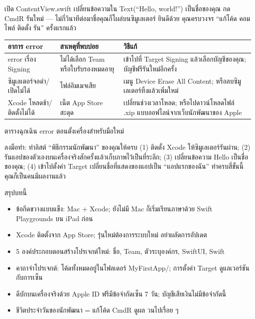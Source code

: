 

เปิด ContentView.swift เปลี่ยนข้อความใน Text(“Hello, world!”) เป็นชื่อของคุณ กด CmdR รันใหม่ — ไม่กี่วินาทีต่อมาชื่อคุณก็โผล่บนซิมูเลเตอร์ ยินดีด้วย คุณครบวงจร “แก้โค้ด คอมไพล์ ติดตั้ง รัน” ครั้งแรกแล้ว

\begin{center}
\begin{tabularx}{\linewidth}{|X|X|X|}
\hline
\textbf{อาการ error} & \textbf{สาเหตุที่พบบ่อย} & \textbf{วิธีแก้} \tabularnewline
\hline
error เรื่อง Signing & ไม่ได้เลือก Team หรือใบรับรองหมดอายุ & เข้าไปที่ Target Signing แล้วเลือกบัญชีของคุณ; บัญชีฟรีรันใหม่อีกครั้ง \tabularnewline
ซิมูเลเตอร์จอดำ/เปิดไม่ได้ & ไฟล์อิมเมจเสีย & เมนู Device Erase All Content; หรือลบซิมูเลเตอร์ทิ้งแล้วเพิ่มใหม่ \tabularnewline
Xcode โหลดช้า/ติดตั้งไม่ได้ & เน็ต App Store สะดุด & เปลี่ยนช่วงเวลาโหลด; หรือไปดาวน์โหลดไฟล์ .xip แบบออฟไลน์จากเว็บนักพัฒนาของ Apple \tabularnewline
\hline
\end{tabularx}
\end{center}

\begin{center}\small\color{gray}ตารางฉุกเฉิน error ตอนตั้งเครื่องสำหรับมือใหม่\end{center}

\begin{tcbpractice}{ลงมือทำ: ทำลิสต์ “พิธีกรรมนักพัฒนา” ของคุณให้ครบ}
(1) ติดตั้ง Xcode ให้ซิมูเลเตอร์รันผ่าน; (2) รันแอปของตัวเองบนเครื่องจริงสักครั้งแล้วเก็บภาพไว้เป็นที่ระลึก; (3) เปลี่ยนข้อความ Hello เป็นชื่อของคุณ; (4) เข้าไปตั้งค่า Target เปลี่ยนชื่อที่แสดงของแอปเป็น “แอปแรกของฉัน” ทำครบสี่ขั้นนี้ คุณก็เป็นคนมีผลงานแล้ว

\end{tcbpractice}

\begin{tcbsummary}{สรุปบทนี้}
\begin{itemize}
  \item ข้อกีดขวางแบบแข็ง: Mac + Xcode; ยังไม่มี Mac ก็เริ่มเรียนภาษาด้วย Swift Playgrounds บน iPad ก่อน
  \item Xcode ติดตั้งจาก App Store; รุ่นใหม่ต้องการระบบใหม่ อย่าผลัดการอัปเดต
  \item 5 องค์ประกอบตอนสร้างโปรเจกต์ใหม่: ชื่อ, Team, ตัวระบุองค์กร, SwiftUI, Swift
  \item คาถาจำโปรเจกต์: โค้ดทั้งหมดอยู่ในโฟลเดอร์ MyFirstApp/; การตั้งค่า Target ดูแลเวอร์ชันกับการเซ็น
  \item ดีบักบนเครื่องจริงด้วย Apple ID ฟรีมีข้อจำกัดเซ็น 7 วัน; บัญชีเสียเงินไม่มีข้อจำกัดนี้
  \item ชีวิตประจำวันของนักพัฒนา = แก้โค้ด CmdR ดูผล วนไปเรื่อย ๆ
\end{itemize}

\end{tcbsummary}
